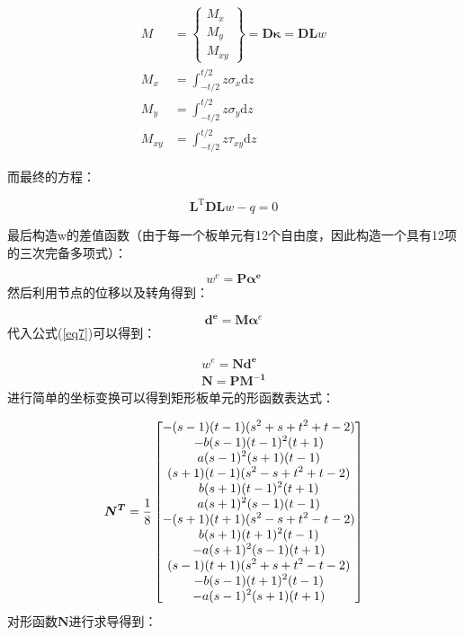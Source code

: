 \documentclass[forprint]{WHUBachelor}
\begin{document}
\begin{equation}
\begin{aligned}M & =\left\{ \begin{array}{l}
{M_{x}}\\
{M_{y}}\\
{M_{xy}}
\end{array}\right\} =\boldsymbol{D}\boldsymbol{\kappa}=\boldsymbol{D}\boldsymbol{L}w\\
M_{x} & =\int_{-t/2}^{t/2}z\sigma_{x}\mathrm{d}z\\
M_{y} & =\int_{-t/2}^{t/2}z\sigma_{y}\mathrm{d}z\\
M_{xy} & =\int_{-t/2}^{t/2}z\tau_{xy}\mathrm{d}z
\end{aligned}
\label{eq5}
\end{equation}

而最终的方程：

\begin{equation}
\boldsymbol{L}^{\mathrm{T}}\boldsymbol{D}\boldsymbol{L}w-q=0\label{eq6}
\end{equation}

最后构造w的差值函数（由于每一个板单元有12个自由度，因此构造一个具有12项的三次完备多项式）：

\begin{equation}
w^{e}=\bm{P}\bm{\alpha^{e}}\label{eq7}
\end{equation}
然后利用节点的位移以及转角得到：

\begin{equation}
\bm{d^{e}}=\bm{M}\bm{\alpha}^{e}\label{eq8}
\end{equation}
代入公式(\ref{eq7})可以得到：

\begin{equation}
\begin{array}{c}
w^{e}=\bm{Nd^{e}}\\
\bm{N=PM^{-1}}
\end{array}\label{eq9}
\end{equation}
进行简单的坐标变换可以得到矩形板单元的形函数表达式：

\begin{equation}
\text{\ensuremath{\bm{N^{T}}=\frac{1}{8}\begin{bmatrix}-(s-1)(t-1)(s^{2}+s+t^{2}+t-2)\\
-b(s-1)(t-1)^{2}(t+1)\\
a(s-1)^{2}(s+1)(t-1)\\
(s+1)(t-1)(s^{2}-s+t^{2}+t-2)\\
b(s+1)(t-1)^{2}(t+1)\\
a(s+1)^{2}(s-1)(t-1)\\
-(s+1)(t+1)(s^{2}-s+t^{2}-t-2)\\
b(s+1)(t+1)^{2}(t-1)\\
-a(s+1)^{2}(s-1)(t+1)\\
(s-1)(t+1)(s^{2}+s+t^{2}-t-2)\\
-b(s-1)(t+1)^{2}(t-1)\\
-a(s-1)^{2}(s+1)(t+1)
\end{bmatrix}}}\label{eq10}
\end{equation}
对形函数$\bm{N}$进行求导得到：
\end{document}
